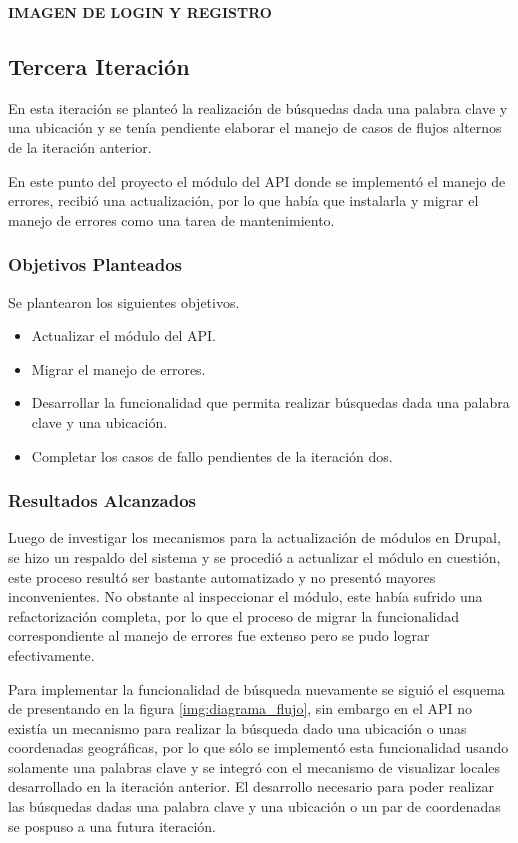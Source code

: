   \textbf{IMAGEN DE LOGIN Y REGISTRO}
\subsection{Tercera Iteración}

En esta iteración se planteó la realización de búsquedas dada una palabra clave y una ubicación y se tenía pendiente elaborar el manejo de casos de flujos alternos de la iteración anterior.

En este punto del proyecto el módulo del API donde se implementó el manejo de errores, recibió una actualización, por lo que había que instalarla y migrar el manejo de errores como una tarea de mantenimiento.

\subsubsection{Objetivos Planteados} 
Se plantearon los siguientes objetivos.
\begin{itemize}
\item Actualizar el módulo del API.
\item Migrar el manejo de errores.
\item Desarrollar la funcionalidad que permita realizar búsquedas dada una palabra clave y una ubicación.
\item Completar los casos de fallo pendientes de la iteración dos.
\end{itemize}

\subsubsection{Resultados Alcanzados}

Luego de investigar los mecanismos para la actualización de módulos en Drupal, se hizo un respaldo del sistema y se procedió a actualizar el módulo en cuestión, este proceso resultó ser bastante automatizado y no presentó mayores inconvenientes. No obstante al inspeccionar el módulo, este había sufrido una refactorización completa, por lo que el proceso de migrar la funcionalidad correspondiente al manejo de errores fue extenso pero se pudo lograr efectivamente.

Para implementar la funcionalidad de búsqueda nuevamente se siguió el esquema de presentando en la figura \ref{img:diagrama_flujo}, sin embargo en el API no existía un mecanismo para realizar la búsqueda dado una ubicación o unas coordenadas geográficas, por lo que sólo se implementó esta funcionalidad usando solamente una palabras clave y se integró con el mecanismo de visualizar locales desarrollado en la iteración anterior. El desarrollo necesario para poder realizar las búsquedas dadas una palabra clave y una ubicación o un par de coordenadas se pospuso a una futura iteración.

